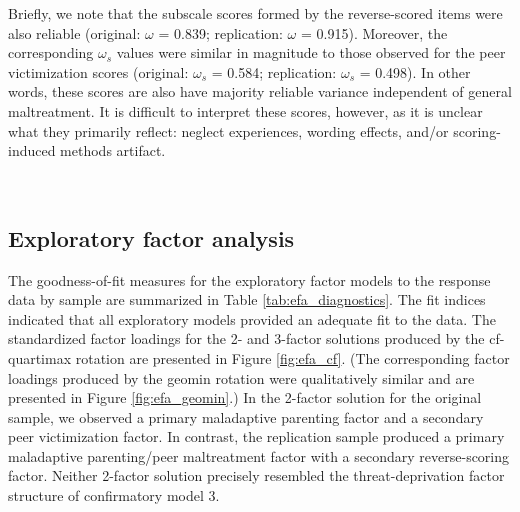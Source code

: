 \documentclass[letterpaper,man,natbib,noextraspace,floatsintext,longtable]{apa6}
\begin{document}
Briefly, we note that the subscale scores formed by the reverse-scored items were also reliable (original: $\omega$ = 0.839; replication: $\omega$ = 0.915). Moreover, the corresponding $\omega_s$ values were similar in magnitude to those observed for the peer victimization scores (original: $\omega_s$ = 0.584; replication: $\omega_s$ = 0.498). In other words, these scores are also have majority reliable variance independent of general maltreatment. It is difficult to interpret these scores, however, as it is unclear what they primarily reflect: neglect experiences, wording effects, and/or scoring-induced methods artifact. 

{\begin{spacing}{0.2} \hfill \\ \end{spacing}} \subsection{Exploratory factor analysis}

The goodness-of-fit measures for the exploratory factor models to the response data by sample are summarized in Table \ref{tab:efa_diagnostics}. The fit indices indicated that all exploratory models provided an adequate fit to the data. The standardized factor loadings for the 2- and 3-factor solutions produced by the cf-quartimax rotation are presented in Figure \ref{fig:efa_cf}. (The corresponding factor loadings produced by the geomin rotation were qualitatively similar and are presented in Figure \ref{fig:efa_geomin}.) In the 2-factor solution for the original sample, we observed a primary maladaptive parenting factor and a secondary peer victimization factor. In contrast, the replication sample produced a primary maladaptive parenting/peer maltreatment factor with a secondary reverse-scoring factor. Neither 2-factor solution precisely resembled the threat-deprivation factor structure of confirmatory model 3.
\end{document}
